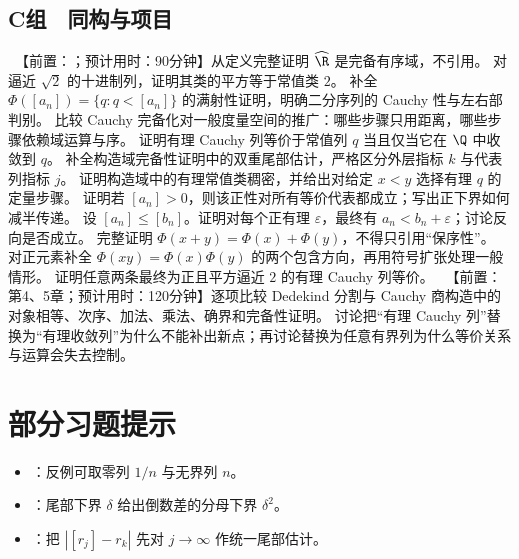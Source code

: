 \subsection*{C组　同构与项目}
\begin{enumerate}[label=\textbf{5.\arabic*.},resume]
  \projectdo\ 【前置：；预计用时：90分钟】从定义完整证明 \(\widehat{\R}\) 是完备有序域，不引用。
  \mustdo 对逼近 \(\sqrt2\) 的十进制列，证明其类的平方等于常值类 \(2\)。
  \optionaldo 补全 \(\Phi([a_n])=\{q:q<[a_n]\}\) 的满射性证明，明确二分序列的 Cauchy 性与左右部判别。
  \opendo 比较 Cauchy 完备化对一般度量空间的推广：哪些步骤只用距离，哪些步骤依赖域运算与序。
  \mustdo 证明有理 Cauchy 列等价于常值列 \(q\) 当且仅当它在 \(\Q\) 中收敛到 \(q\)。
  \mustdo 补全构造域完备性证明中的双重尾部估计，严格区分外层指标 \(k\) 与代表列指标 \(j\)。
  \mustdo 证明构造域中的有理常值类稠密，并给出对给定 \(x<y\) 选择有理 \(q\) 的定量步骤。
  \mustdo 证明若 \([a_n]>0\)，则该正性对所有等价代表都成立；写出正下界如何减半传递。
  \mustdo 设 \([a_n]\le[b_n]\)。证明对每个正有理 \(\varepsilon\)，最终有 \(a_n<b_n+\varepsilon\)；讨论反向是否成立。
  \mustdo 完整证明 \(\Phi(x+y)=\Phi(x)+\Phi(y)\)，不得只引用“保序性”。
  \optionaldo 对正元素补全 \(\Phi(xy)=\Phi(x)\Phi(y)\) 的两个包含方向，再用符号扩张处理一般情形。
  \mustdo 证明任意两条最终为正且平方逼近 \(2\) 的有理 Cauchy 列等价。
  \projectdo\ 【前置：第4、5章；预计用时：120分钟】逐项比较 Dedekind 分割与 Cauchy 商构造中的对象相等、次序、加法、乘法、确界和完备性证明。
  \opendo 讨论把“有理 Cauchy 列”替换为“有理收敛列”为什么不能补出新点；再讨论替换为任意有界列为什么等价关系与运算会失去控制。
\end{enumerate}

\section*{部分习题提示}
\begin{itemize}
 \item {}：反例可取零列 \(1/n\) 与无界列 \(n\)。
 \item {}：尾部下界 \(\delta\) 给出倒数差的分母下界 \(\delta^2\)。
 \item {}：把 \(|[r_j]-r_k|\) 先对 \(j\to\infty\) 作统一尾部估计。
\end{itemize}

